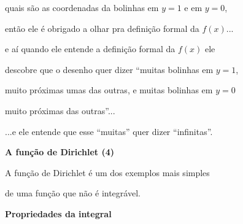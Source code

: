 \documentclass[oneside,12pt]{article}
\begin{document}
quais são as coordenadas da bolinhas em $y=1$ e em $y=0$,

então ele é obrigado a olhar pra definição formal da $f(x)$...

\msk

e aí quando ele entende a definição formal da $f(x)$ ele

descobre que o desenho quer dizer ``muitas bolinhas em $y=1$,

muito próximas umas das outras, e muitas bolinhas em $y=0$

muito próximas das outras''...

\msk

...e ele entende que esse ``muitas'' quer dizer ``infinitas''.




\newpage

{\bf A função de Dirichlet (4)}


A função de Dirichlet é um dos exemplos mais simples

de uma função que não é integrável.


\newpage





{\bf Propriedades da integral}









\end{document}
